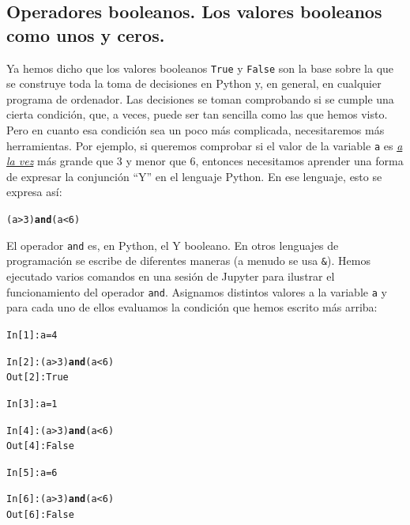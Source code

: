 \documentclass[10pt,a4paper]{article}\usepackage[]{graphicx}\usepackage[]{color}
\makeatletter
\newcommand{\hlkwd}[1]{\textcolor[rgb]{0.737,0.353,0.396}{\textbf{#1}}}%
\newenvironment{kframe}{%
 \def\at@end@of@kframe{}%
 \ifinner\ifhmode%
  \def\at@end@of@kframe{\end{minipage}}%
  \begin{minipage}{\columnwidth}%
 \fi\fi%
 \def\FrameCommand##1{\hskip\@totalleftmargin \hskip-\fboxsep
 \colorbox{shadecolor}{##1}\hskip-\fboxsep
     \hskip-\linewidth \hskip-\@totalleftmargin \hskip\columnwidth}%
 \MakeFramed {\advance\hsize-\width
   \@totalleftmargin\z@ \linewidth\hsize
   \@setminipage}}%
 {\par\unskip\endMakeFramed%
 \at@end@of@kframe}
\newenvironment{knitrout}{}{} %
\makeatother
\begin{document}
\subsection{Operadores booleanos. Los valores booleanos como unos y ceros.}
\label{tut02:subsec:BooleanosComoUnosCeros}

Ya hemos dicho que los valores booleanos {\tt True} y {\tt False} son la base sobre la que se construye toda la toma de decisiones en Python y, en general, en cualquier programa de ordenador. Las decisiones se toman comprobando si se cumple una cierta condición, que, a veces, puede ser tan sencilla como las que hemos visto. Pero en cuanto esa condición sea un poco más complicada, necesitaremos más herramientas. Por ejemplo, si queremos comprobar si el valor de la variable {\tt a} es \underline{\em a la vez} más grande que $3$ y menor que $6$, entonces necesitamos aprender una forma de expresar la conjunción ``Y'' en el lenguaje Python. En ese lenguaje, esto se expresa así:
\begin{knitrout}
\color{fgcolor}\begin{kframe}
\begin{alltt}
(a > 3)  \hlkwd{and} (a < 6)
\end{alltt}
\end{kframe}
\end{knitrout}
El operador {\tt and} es, en Python, el {\sf Y booleano}. En otros lenguajes de programación se escribe de diferentes maneras (a menudo se usa \verb#&#). Hemos ejecutado varios comandos en una sesión de Jupyter para ilustrar el funcionamiento del operador {\tt and}. Asignamos distintos valores a la variable {\tt a} y para cada uno de ellos evaluamos la condición que hemos escrito más arriba:
\begin{knitrout}
\color{fgcolor}\begin{kframe}
\begin{alltt}
In [1]: a = 4

In [2]: (a > 3) \hlkwd{and} (a < 6)
Out[2]: True

In [3]: a = 1

In [4]: (a > 3) \hlkwd{and} (a < 6)
Out[4]: False

In [5]: a = 6

In [6]: (a > 3) \hlkwd{and} (a < 6)
Out[6]: False
\end{alltt}
\end{kframe}
\end{knitrout}
\end{document}
